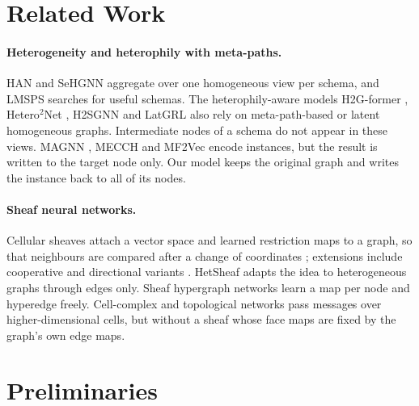 \documentclass{article}
\begin{document}
\section{Related Work}
\label{sec:related}

\paragraph{Heterogeneity and heterophily with meta-paths.} HAN \cite{wang2019han} and SeHGNN \cite{yang2023sehgnn} aggregate over one homogeneous view per schema, and LMSPS \cite{li2024lmsps} searches for useful schemas. The heterophily-aware models H2G-former \cite{lin2025heterophily}, Hetero$^2$Net \cite{li2025hetero2net}, H2SGNN \cite{lu2026addressing} and LatGRL \cite{shen2025heterophily} also rely on meta-path-based or latent homogeneous graphs. Intermediate nodes of a schema do not appear in these views. MAGNN \cite{fu2020magnn}, MECCH \cite{fu2024mecch} and MF2Vec \cite{kim2024mf2vec} encode instances, but the result is written to the target node only. Our model keeps the original graph and writes the instance back to all of its nodes.

\paragraph{Sheaf neural networks.} Cellular sheaves attach a vector space and learned restriction maps to a graph, so that neighbours are compared after a change of coordinates \cite{hansen2020sheaf,bodnar2022neural,barbero2022sheaf}; extensions include cooperative and directional variants \cite{ribeiro2026cooperative,fiorini2025sheaves}. HetSheaf \cite{braithwaite2024heterogeneous} adapts the idea to heterogeneous graphs through edges only. Sheaf hypergraph networks \cite{duta2023sheafhyper} learn a map per node and hyperedge freely. Cell-complex and topological networks \cite{bodnar2021cwn,hajij2022tdl,hajij2025ctnn} pass messages over higher-dimensional cells, but without a sheaf whose face maps are fixed by the graph's own edge maps.

\section{Preliminaries}
\label{sec:background}
\end{document}
